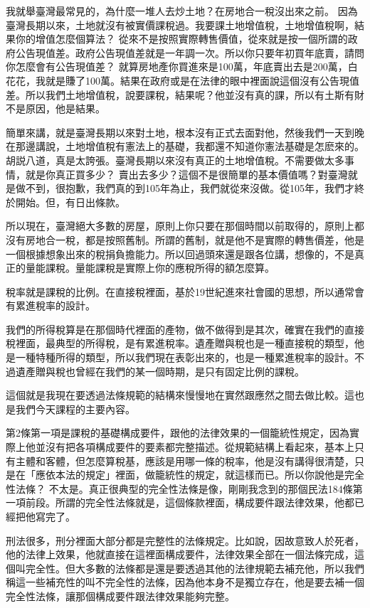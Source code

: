 \documentclass[oneside,sub3section]{ctexbook}
\begin{document}
我就舉臺灣最常見的，為什麼一堆人去炒土地？在房地合一稅沒出來之前。 因為臺灣長期以來，土地就沒有被實價課稅過。我要課土地增值稅，土地增值稅啊，結果你的增值怎麼個算法？ 從來不是按照實際轉售價值，從來就是按一個所謂的政府公告現值差。政府公告現值差就是一年調一次。所以你只要年初買年底賣，請問你怎麼會有公告現值差？ 就算房地產你買進來是100萬，年底賣出去是200萬，白花花，我就是賺了100萬。結果在政府或是在法律的眼中裡面說這個沒有公告現值差。所以我們土地增值稅，說要課稅，結果呢？他並沒有真的課，所以有土斯有財不是原因，他是結果。

簡單來講，就是臺灣長期以來對土地，根本沒有正式去面對他，然後我們一天到晚在那邊講說，土地增值稅有憲法上的基礎，我都還不知道你憲法基礎是怎麽來的。胡説八道，真是太誇張。臺灣長期以來沒有真正的土地增值稅。不需要做太多事情，就是你真正買多少？ 賣出去多少？這個不是很簡單的基本價值嗎？對臺灣就是做不到，很抱歉，我們真的到105年為止，我們就從來沒做。從105年，我們才終於開始。但，有日出條款。

所以現在，臺灣絕大多數的房屋，原則上你只要在那個時間以前取得的，原則上都沒有房地合一稅，都是按照舊制。所謂的舊制，就是他不是實際的轉售價差，他是一個根據想象出來的稅捐負擔能力。所以回過頭來還是跟各位講，想像的，不是真正的量能課稅。量能課稅是實際上你的應稅所得的額怎麼算。

稅率就是課稅的比例。在直接稅裡面，基於19世紀進來社會國的思想，所以通常會有累進稅率的設計。

我們的所得稅算是在那個時代裡面的產物，做不做得到是其次，確實在我們的直接稅裡面，最典型的所得稅，是有累進稅率。遺產贈與稅也是一種直接稅的類型，他是一種特種所得的類型，所以我們現在表彰出來的，也是一種累進稅率的設計。不過遺產贈與稅也曾經在我們的某一個時期，是只有固定比例的課稅。

這個就是我現在要透過法條規範的結構來慢慢地在實然跟應然之間去做比較。這也是我們今天課程的主要內容。

第2條第一項是課稅的基礎構成要件，跟他的法律效果的一個籠統性規定，因為實際上他並沒有把各項構成要件的要素都完整描述。從規範結構上看起來，基本上只有主體和客體，但怎麼算稅基，應該是用哪一條的稅率，他是沒有講得很清楚，只是在「應依本法的規定」裡面，做籠統性的規定，就這樣而已。所以你說他是完全性法條？ 不太是。真正很典型的完全性法條是像，剛剛我念到的那個民法184條第一項前段。所謂的完全性法條就是，這個條款裡面，構成要件跟法律效果，他都已經把他寫完了。

刑法很多，刑分裡面大部分都是完整性的法條規定。比如說，因故意致人於死者，他的法律上效果，他就直接在這裡面構成要件，法律效果全部在一個法條完成，這個叫完全性。但大多數的法條都是還是要透過其他的法律規範去補充他，所以我們稱這一些補充性的叫不完全性的法條，因為他本身不是獨立存在，他是要去補一個完全性法條，讓那個構成要件跟法律效果能夠完整。
\end{document}
